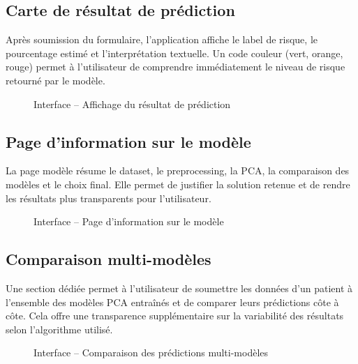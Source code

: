\documentclass[12pt,a4paper]{report}
\begin{document}
\subsection{Carte de résultat de prédiction}
Après soumission du formulaire, l'application affiche le label de risque, le pourcentage estimé et l'interprétation textuelle. Un code couleur (vert, orange, rouge) permet à l'utilisateur de comprendre immédiatement le niveau de risque retourné par le modèle.

\begin{figure}[H]
\centering
\fbox{\rule{0pt}{5cm}\hspace{12cm}}
\caption{Interface -- Affichage du résultat de prédiction}
\label{fig:interface_result}
\end{figure}

\subsection{Page d'information sur le modèle}
La page modèle résume le dataset, le preprocessing, la PCA, la comparaison des modèles et le choix final. Elle permet de justifier la solution retenue et de rendre les résultats plus transparents pour l'utilisateur.

\begin{figure}[H]
\centering
\fbox{\rule{0pt}{6cm}\hspace{12cm}}
\caption{Interface -- Page d'information sur le modèle}
\label{fig:interface_model}
\end{figure}

\subsection{Comparaison multi-modèles}
Une section dédiée permet à l'utilisateur de soumettre les données d'un patient à l'ensemble des modèles PCA entraînés et de comparer leurs prédictions côte à côte. Cela offre une transparence supplémentaire sur la variabilité des résultats selon l'algorithme utilisé.

\begin{figure}[H]
\centering
\fbox{\rule{0pt}{6cm}\hspace{12cm}}
\caption{Interface -- Comparaison des prédictions multi-modèles}
\label{fig:interface_compare}
\end{figure}
\end{document}
